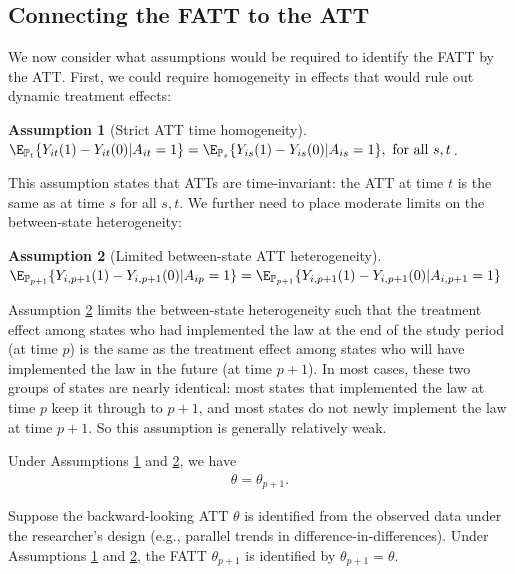 \documentclass{article}
\newtheorem{assumption}{Assumption}
\renewcommand{\P}{\mathbb{P}}
\begin{document}
\subsection{Connecting the FATT to the ATT}
We now consider what assumptions would be required to identify the FATT by the ATT. First, we could require homogeneity in effects that would rule out dynamic treatment effects:
\begin{assumption}[Strict ATT time homogeneity]
    $\E_{\P_t}\{Y_{it}(1) - Y_{it}(0) | A_{it} = 1\} = \E_{\P_s}\{Y_{is}(1) - Y_{is}(0) | A_{is} = 1\}, \text{ for all } s, t$.\label{strict-time-homogeneity}
\end{assumption}
This assumption states that ATTs are time-invariant: the ATT at time $t$ is the same as at time $s$ for all $s, t$. 
We further need to place moderate limits on the between-state heterogeneity:
\begin{assumption}[Limited between-state ATT heterogeneity]
    $\E_{\P_{p+1}}\{Y_{i,p+1}(1) - Y_{i,p+1}(0) | A_{ip} = 1\} = \E_{\P_{p+1}}\{Y_{i,p+1}(1) - Y_{i,p+1}(0) | A_{i,p+1} = 1\}$\label{p-to-p-plus-one-heterogeneity}
\end{assumption}
Assumption \ref{p-to-p-plus-one-heterogeneity} limits the between-state heterogeneity such that the treatment effect among states who had implemented the law at the end of the study period (at time $p$) is the same as the treatment effect among states who will have implemented the law in the future (at time $p+1$). In most cases, these two groups of states are nearly identical: most states that implemented the law at time $p$ keep it through to $p+1$, and most states do not newly implement the law at time $p+1$. So this assumption is generally relatively weak.

Under Assumptions \ref{strict-time-homogeneity} and \ref{p-to-p-plus-one-heterogeneity}, we have 
\begin{align*}
    \theta = \theta_{p+1}.
\end{align*}

\begin{proposition}\label{prop:path1}
Suppose the backward-looking ATT $\theta$ is identified from the observed data under the researcher's design (e.g., parallel trends in difference-in-differences). Under Assumptions \ref{strict-time-homogeneity} and \ref{p-to-p-plus-one-heterogeneity}, the FATT $\theta_{p+1}$ is identified by $\theta_{p+1} = \theta$.
\end{proposition}
\end{document}

